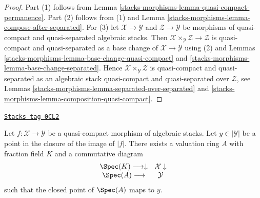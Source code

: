 \begin{proof}
Part (1) follows from
Lemma \ref{stacks-morphisms-lemma-quasi-compact-permanence}.
Part (2) follows from (1) and
Lemma \ref{stacks-morphisms-lemma-compose-after-separated}.
For (3) let $\mathcal{X} \to \mathcal{Y}$ and $\mathcal{Z} \to \mathcal{Y}$
be morphisms of quasi-compact and quasi-separated algebraic stacks.
Then $\mathcal{X} \times_\mathcal{Y} \mathcal{Z} \to \mathcal{Z}$
is quasi-compact and quasi-separated as a base change of
$\mathcal{X} \to \mathcal{Y}$ using (2) and
Lemmas \ref{stacks-morphisms-lemma-base-change-quasi-compact} and
\ref{stacks-morphisms-lemma-base-change-separated}.
Hence $\mathcal{X} \times_\mathcal{Y} \mathcal{Z}$
is quasi-compact and quasi-separated as
an algebraic stack quasi-compact and quasi-separated over
$\mathcal{Z}$, see
Lemmas \ref{stacks-morphisms-lemma-separated-over-separated} and
\ref{stacks-morphisms-lemma-composition-quasi-compact}.
\end{proof}

\begin{lemma}
\label{stacks-morphisms-lemma-reach-points-scheme-theoretic-image}
\href{https://stacks.math.columbia.edu/tag/0CL2}{\texttt{Stacks tag 0CL2}}

Let $f : \mathcal{X} \to \mathcal{Y}$ be a quasi-compact morphism of
algebraic stacks. Let $y \in |\mathcal{Y}|$ be a point in the closure
of the image of $|f|$. There exists a valuation ring $A$ with
fraction field $K$ and a commutative diagram
$$
\begin{array}{cc}\Spec(K) \longrightarrow\downarrow & \mathcal{X} \downarrow \\ \Spec(A) \longrightarrow & \mathcal{Y}\end{array}
$$
such that the closed point of $\Spec(A)$ maps to $y$.
\end{lemma}

